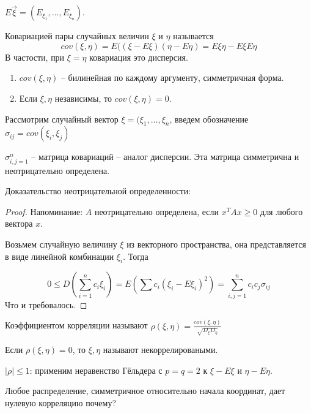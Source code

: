 \begin{Def}
    $E{\vec{\xi}} = (E_{\xi_1}, \dots, E_{\xi_n})$.
\end{Def}
\begin{Def}
    Ковариацией пары случайных величин $\xi$ и $\eta$ называется $$cov(\xi, \eta) = E((\xi - E\xi)(\eta - E\eta) = E\xi\eta - E\xi E\eta$$ 
    В частости, при $\xi = \eta$ ковариация это дисперсия.
\end{Def}

\begin{theorem}
\begin{enumerate}
    \item $cov(\xi, \eta)$ -- билинейная по каждому аргументу, симметричная форма.
    \item Если $\xi, \eta$ независимы, то $cov(\xi, \eta) = 0$.
\end{enumerate}
\end{theorem}

\begin{Def}
    Рассмотрим случайный вектор $\xi = (\xi_1, \dots, \xi_n$, введем обозначение $\sigma_{ij} = cov(\xi_i, \xi_j)$

    $\sigma_{i,j=1}^n$ -- матрица ковариаций -- аналог дисперсии. Эта матрица симметрична и неотрицательно определена.
\end{Def}
Доказательство неотрицательной определенности:
\begin{proof}
Напоминание: $A$ неотрицательно определена, если $x^TAx \geq 0$ для любого вектора $x$. 

Возьмем случайную величину $\xi$ из векторного пространства, она представляется в виде линейной комбинации $\xi_i$. Тогда

$$0 \leq D(\sum\limits_{i = 1}^n c_i \xi_i) = E(\sum c_i (\xi_i - E \xi_i)^2) = \sum\limits_{i,j=1}^n c_i c_j \sigma_{ij}$$
Что и требовалось.
\end{proof}

\begin{Def}
    Коэффициентом корреляции называют $\rho(\xi, \eta) = \frac{cov(\xi, \eta)}{\sqrt{D_\xi D_\eta}}$
    
    Если $\rho(\xi, \eta) = 0$, то $\xi, \eta$ называют некоррелироваными.
\end{Def}
\begin{Rem}
    $|\rho| \leq 1$: применим неравенство Гёльдера с $p=q=2$ к $\xi - E\xi$ и $\eta - E\eta$.
\end{Rem}

Любое распределение, симметричное относительно начала координат, дает нулевую корреляцию \TODO почему?

